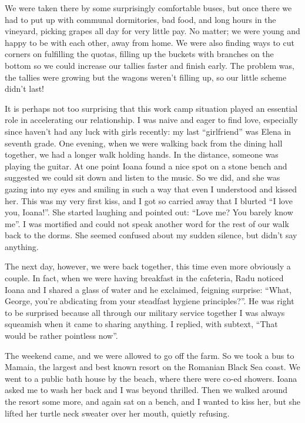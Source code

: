 \documentclass[12pt]{book}
\begin{document}
We were taken there by some surprisingly comfortable buses, but once
there we had to put up with communal dormitories, bad food, and long
hours in the vineyard, picking grapes all day for very little pay. No
matter; we were young and happy to be with each other, away from home.
We were also finding ways to cut corners on fulfilling the quotas,
filling up the buckets with branches on the bottom so we could increase
our tallies faster and finish early. The problem was, the tallies were
growing but the wagons weren't filling up, so our little scheme didn't
last!

It is perhaps not too surprising that this work camp situation played an
essential role in accelerating our relationship. I was naive and eager
to find love, especially since haven't had any luck with girls recently:
my last ``girlfriend'' was Elena in seventh grade. One evening, when we
were walking back from the dining hall together, we had a longer walk
holding hands. In the distance, someone was playing the guitar. At one
point Ioana found a nice spot on a stone bench and suggested we could
sit down and listen to the music. So we did, and she was gazing into my
eyes and smiling in such a way that even I understood and kissed her.
This was my very first kiss, and I got so carried away that I blurted
``I love you, Ioana!''. She started laughing and pointed out: ``Love me?
You barely know me''. I was mortified and could not speak another word
for the rest of our walk back to the dorms. She seemed confused about my
sudden silence, but didn't say anything.

The next day, however, we were back together, this time even more
obviously a couple. In fact, when we were having breakfast in the
cafeteria, Radu noticed Ioana and I shared a glass of water and he
exclaimed, feigning surprise: ``What, George, you're abdicating from
your steadfast hygiene principles?''. He was right to be surprised
because all through our military service together I was always squeamish
when it came to sharing anything. I replied, with subtext, ``That would
be rather pointless now''.

The weekend came, and we were allowed to go off the farm. So we took a
bus to Mamaia, the largest and best known resort on the Romanian Black
Sea coast. We went to a public bath house by the beach, where there were
co-ed showers. Ioana asked me to wash her back and I was beyond
thrilled. Then we walked around the resort some more, and again sat on a
bench, and I wanted to kiss her, but she lifted her turtle neck sweater
over her mouth, quietly refusing.
\end{document}
